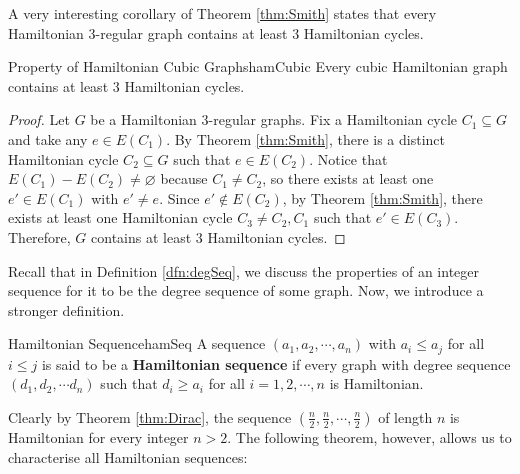 \documentclass[math]{amznotes}
\theoremstyle{remark}
\newcommand{\0}{\mathbf{0}}
\newcommand{\1}{\mathbf{1}}
\begin{document}
A very interesting corollary of Theorem \ref{thm:Smith} states that every Hamiltonian $3$-regular graph contains at least $3$ Hamiltonian cycles.
\begin{corbox}{Property of Hamiltonian Cubic Graphs}{hamCubic}
    Every cubic Hamiltonian graph contains at least $3$ Hamiltonian cycles.
    \tcblower
    \begin{proof}
        Let $G$ be a Hamiltonian $3$-regular graphs. Fix a Hamiltonian cycle $C_1 \subseteq G$ and take any $e \in E(C_1)$. By Theorem \ref{thm:Smith}, there is a distinct Hamiltonian cycle $C_2 \subseteq G$ such that $e \in E(C_2)$. Notice that $E(C_1) - E(C_2) \neq \varnothing$ because $C_1 \neq C_2$, so there exists at least one $e' \in E(C_1)$ with $e' \neq e$. Since $e' \notin E(C_2)$, by Theorem \ref{thm:Smith}, there exists at least one Hamiltonian cycle $C_3 \neq C_2, C_1$ such that $e' \in E(C_3)$. Therefore, $G$ contains at least $3$ Hamiltonian cycles.
    \end{proof}
\end{corbox}
Recall that in Definition \ref{dfn:degSeq}, we discuss the properties of an integer sequence for it to be the degree sequence of some graph. Now, we introduce a stronger definition.
\begin{dfnbox}{Hamiltonian Sequence}{hamSeq}
    A sequence $(a_1, a_2, \cdots, a_n)$ with $a_i \leq a_j$ for all $i \leq j$ is said to be a {\color{red} \textbf{Hamiltonian sequence}} if every graph with degree sequence $(d_1, d_2, \cdots d_n)$ such that $d_i \geq a_i$ for all $i = 1, 2, \cdots, n$ is Hamiltonian.
\end{dfnbox}
Clearly by Theorem \ref{thm:Dirac}, the sequence $\left(\frac{n}{2}, \frac{n}{2}, \cdots, \frac{n}{2}\right)$ of length $n$ is Hamiltonian for every integer $n > 2$. The following theorem, however, allows us to characterise all Hamiltonian sequences:
\end{document}

